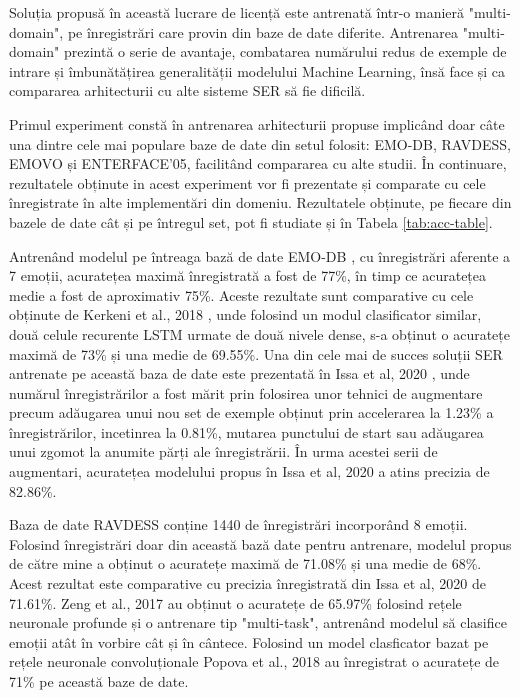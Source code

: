 \documentclass[a4paper,12pt]{book}
\begin{document}
		 Soluția propusă în această lucrare de licență este antrenată într-o manieră "multi-domain", pe înregistrări care provin din baze de date diferite. Antrenarea "multi-domain" prezintă o serie de avantaje, combatarea numărului redus de exemple de intrare și îmbunătățirea generalității modelului Machine Learning, însă face și ca compararea arhitecturii cu alte sisteme SER să fie dificilă. \par
		 Primul experiment constă în antrenarea arhitecturii propuse implicând doar câte una dintre cele mai populare baze de date din setul folosit: EMO-DB, RAVDESS, EMOVO și ENTERFACE'05, facilitând compararea cu alte studii. În continuare,  rezultatele obținute in acest experiment vor fi prezentate și comparate cu cele înregistrate în alte implementări din domeniu. Rezultatele obținute, pe fiecare din bazele de date cât și pe întregul set, pot fi studiate și în Tabela \ref{tab:acc-table}.
		  \par
		 Antrenând modelul pe întreaga bază de date EMO-DB \cite{emodb}, cu înregistrări aferente a 7 emoții, acuratețea maximă înregistrată a fost de 77\%, în timp ce acuratețea medie a fost de aproximativ 75\%. Aceste rezultate sunt comparative cu cele obținute de Kerkeni et al., 2018 \cite{comp1}, unde folosind un modul clasificator similar, două celule recurente LSTM urmate de două nivele dense, s-a obținut o acuratețe maximă de 73\% și una medie de 69.55\%. Una din cele mai de succes soluții SER antrenate pe această baza de date este prezentată în Issa et al, 2020 \cite{comp2}, unde numărul înregistrărilor a fost mărit prin folosirea unor tehnici de augmentare precum adăugarea unui nou set de exemple obținut prin accelerarea la 1.23\% a înregistrărilor, incetinrea la 0.81\%, mutarea punctului de start sau adăugarea unui zgomot la anumite părți ale înregistrării. În urma acestei serii de augmentari, acuratețea modelului propus în Issa et al, 2020 \cite{comp2} a atins precizia de 82.86\%.\par
		 Baza de date RAVDESS \cite{ravdess} conține 1440 de înregistrări incorporând 8 emoții. Folosind înregistrări doar din această bază date pentru antrenare, modelul propus de către mine a obținut o acuratețe maximă de 71.08\% și una medie de 68\%. Acest rezultat este comparative cu precizia înregistrată din Issa et al, 2020 \cite{comp2} de 71.61\%. Zeng et al., 2017 \cite{comp3} au obținut o acuratețe de 65.97\% folosind rețele neuronale profunde și o antrenare tip "multi-task", antrenând modelul să clasifice emoții atât în vorbire cât și în cântece. Folosind un model clasficator bazat pe rețele neuronale convoluționale Popova et al., 2018 \cite{comp4} au înregistrat o acuratețe de 71\% pe această baze de date. \par
\end{document}
